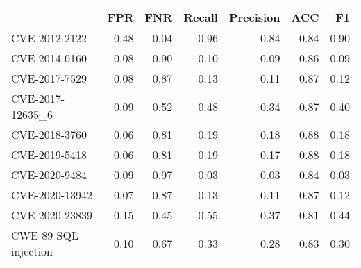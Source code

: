 \begin{tabular}{lrrrrrr}
\toprule
{} &  FPR &  FNR &  Recall &  Precision &  ACC &   F1 \\
\midrule
CVE-2012-2122        & 0.48 & 0.04 &    0.96 &       0.84 & 0.84 & 0.90 \\
CVE-2014-0160        & 0.08 & 0.90 &    0.10 &       0.09 & 0.86 & 0.09 \\
CVE-2017-7529        & 0.08 & 0.87 &    0.13 &       0.11 & 0.87 & 0.12 \\
CVE-2017-12635\_6     & 0.09 & 0.52 &    0.48 &       0.34 & 0.87 & 0.40 \\
CVE-2018-3760        & 0.06 & 0.81 &    0.19 &       0.18 & 0.88 & 0.18 \\
CVE-2019-5418        & 0.06 & 0.81 &    0.19 &       0.17 & 0.88 & 0.18 \\
CVE-2020-9484        & 0.09 & 0.97 &    0.03 &       0.03 & 0.84 & 0.03 \\
CVE-2020-13942       & 0.07 & 0.87 &    0.13 &       0.11 & 0.87 & 0.12 \\
CVE-2020-23839       & 0.15 & 0.45 &    0.55 &       0.37 & 0.81 & 0.44 \\
CWE-89-SQL-injection & 0.10 & 0.67 &    0.33 &       0.28 & 0.83 & 0.30 \\
\bottomrule
\end{tabular}
